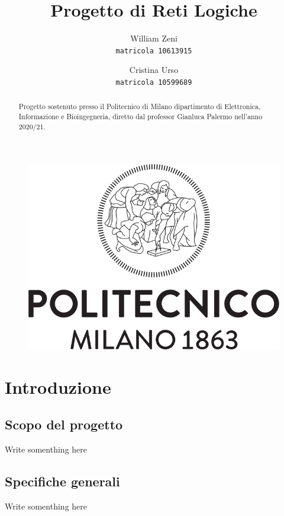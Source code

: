 \documentclass[11pt, a4paper]{article}
\title{Progetto di Reti Logiche}
\author{
  William Zeni\\
  \texttt{matricola 10613915}
  \and
  Cristina Urso\\
  \texttt{matricola 10599689}
}
\begin{document}
\begin{figure}[t]
  \centering
  \vspace{3cm}
  \includegraphics[scale=0.4]{Logo_Politecnico_Milano.png}
  \vspace{3cm}
\end{figure}

\maketitle
\renewcommand{\abstractname}{ }
\begin{abstract}
  \centering
  Progetto sostenuto presso il Politecnico di Milano dipartimento di Elettronica, Informazione e Bioingegneria, diretto dal professor Gianluca Palermo nell'anno 2020/21.
\end{abstract}

\pagebreak
\tableofcontents
\pagebreak


\section{Introduzione}
\subsection{Scopo del progetto}
Write somenthing here

\subsection{Specifiche generali}
Write somenthing here
\end{document}
